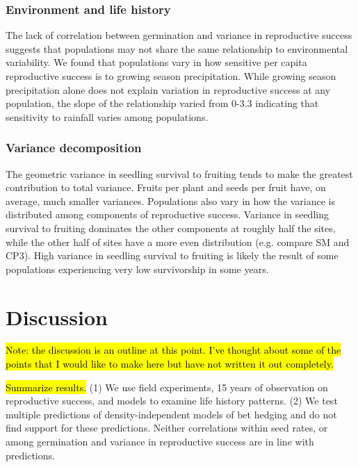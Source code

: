 \documentclass[12pt, oneside]{article}   	%
\begin{document}
\subsubsection*{Environment and life history}

The lack of correlation between germination and variance in reproductive success suggests that populations may not share the same relationship to environmental variability. We found that populations vary in how sensitive per capita reproductive success is to growing season precipitation. While growing season precipitation alone does not explain variation in reproductive success at any population, the slope of the relationship varied from 0-3.3 indicating that sensitivity to rainfall varies among populations.

\subsubsection*{Variance decomposition}

The geometric variance in seedling survival to fruiting tends to make the greatest contribution to total variance. Fruits per plant and seeds per fruit have, on average, much smaller variances. Populations also vary in how the variance is distributed among components of reproductive success. Variance in seedling survival to fruiting dominates the other components at roughly half the sites, while the other half of sites have a more even distribution (e.g. compare SM and CP3). High variance in seedling survival to fruiting is likely the result of some populations experiencing very low survivorship in some years.

\section*{Discussion}

\hl{Note: the discussion is an outline at this point. I've thought about some of the points that I would like to make here but have not written it out completely.}

\hl{Summarize results.} (1) We use field experiments, 15 years of observation on reproductive success, and models to examine life history patterns. (2) We test multiple predictions of density-independent models of bet hedging and do not find support for these predictions. Neither correlations within seed rates, or among germination and variance in reproductive success are in line with predictions. 
\end{document}
